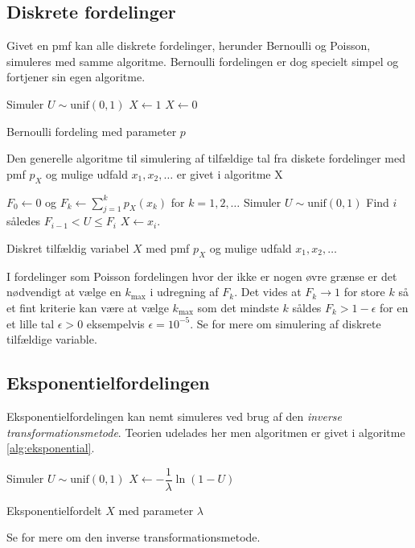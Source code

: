 \subsection{Diskrete fordelinger}
Givet en pmf kan alle diskrete fordelinger, herunder Bernoulli og Poisson, simuleres med samme algoritme. Bernoulli fordelingen er dog specielt simpel og fortjener sin egen algoritme. 
\begin{algorithm}[H]
\begin{algorithmic}
\STATE Simuler $U \sim \text{unif}(0,1)$
\STATE $X \gets 1$
\ELSE
\STATE $X \gets 0$
\ENDIF
\end{algorithmic}
\caption{Bernoulli fordeling med parameter $p$} \label{alg:bernoulli}
\end{algorithm}
Den generelle algoritme til simulering af tilfældige tal fra diskete fordelinger med pmf $p_X$ og mulige udfald $x_1, x_2,\dots$ er givet i algoritme X
\begin{algorithm}[H]
\begin{algorithmic}
\STATE $F_0 \gets 0$ og $F_k \gets \sum_{j=1}^k p_X(x_k)$ for $k = 1,2,\dots$ 
\STATE Simuler $U \sim \text{unif}(0,1)$
\STATE Find $i$ således $F_{i-1} < U \leq F_i$
\STATE $X \gets x_i$. 
\end{algorithmic}
\caption{Diskret tilfældig variabel $X$ med pmf $p_X$ og mulige udfald $x_1,x_2,\dots$} \label{alg:bernoulli}
\end{algorithm}
I fordelinger som Poisson fordelingen hvor der ikke er nogen øvre grænse er det nødvendigt at vælge en $k_{\max}$ i udregning af $F_k$. Det vides at $F_k \to 1$ for store $k$ så et fint kriterie kan være at vælge $k_{\max}$ som det mindste $k$ såldes $F_k > 1 - \epsilon$ for en et lille tal $\epsilon > 0$ eksempelvis $\epsilon = 10^{-5}$. Se \cite[283-285]{olofsson2012} for mere om simulering af diskrete tilfældige variable. 
\subsection{Eksponentielfordelingen}
Eksponentielfordelingen kan nemt simuleres ved brug af den \emph{inverse transformationsmetode}. Teorien udelades her men algoritmen er givet i algoritme \ref{alg:eksponential}. 
\begin{algorithm}[H]
\begin{algorithmic}
\STATE Simuler $U \sim \text{unif}(0,1)$
\STATE $X \gets -\dfrac{1}{\lambda}\ln(1-U)$ 
\end{algorithmic}
\caption{Eksponentielfordelt $X$ med parameter $\lambda$} \label{alg:eksponential}
\end{algorithm}
Se \cite[285-287]{olofsson2012} for mere om den inverse transformationsmetode. 
